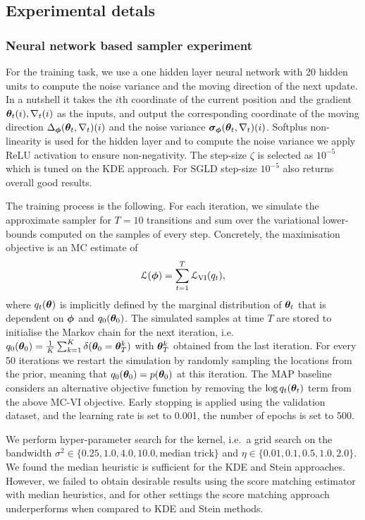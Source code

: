 \subsection{Experimental detals}

\subsubsection{Neural network based sampler experiment}
For the training task, we use a one hidden layer neural network with 20 hidden units to compute the noise variance and the moving direction of the next update. In a nutshell it takes the $i$th coordinate of the current position and the gradient $\bm{\theta}_t(i), \nabla_t(i)$ as the inputs, and output the corresponding coordinate of the moving direction $\Delta_{\bm{\phi}}(\bm{\theta}_t, \nabla_t)(i)$ and the noise variance $\bm{\sigma}_{\bm{\phi}}(\bm{\theta}_t, \nabla_t)(i)$. Softplus non-linearity is used for the hidden layer and to compute the noise variance we apply ReLU activation to ensure non-negativity. The step-size $\zeta$ is selected as $10^{-5}$ which is tuned on the KDE approach. For SGLD step-size $10^{-5}$ also returns overall good results.

The training process is the following. For each iteration, we simulate the approximate sampler for $T=10$ transitions and sum over the variational lower-bounds computed on the samples of every step. Concretely, the maximisation objective is an MC estimate of
$$\mathcal{L}(\bm{\phi}) = \sum_{t=1}^T \mathcal{L}_{\text{VI}}(q_t),$$
where $q_t(\bm{\theta})$ is implicitly defined by the marginal distribution of $\bm{\theta}_t$ that is dependent on $\bm{\phi}$ and $q_0(\bm{\theta}_0)$. 
%
The simulated samples at time $T$ are stored to initialise the Markov chain for the next iteration, i.e. $q_0(\bm{\theta}_0) = \frac{1}{K} \sum_{k=1}^K \delta(\bm{\theta}_0 = \bm{\theta}_T^k)$ with $\bm{\theta}_T^k$ obtained from the last iteration. For every 50 iterations we restart the simulation by randomly sampling the locations from the prior, meaning that $q_0(\bm{\theta}_0) = p(\bm{\theta}_0)$ at this iteration. 
%
The MAP baseline considers an alternative objective function by removing the $\log q_t(\bm{\theta}_t)$ term from the above MC-VI objective.
%
Early stopping is applied using the validation dataset, and the learning rate is set to 0.001, the number of epochs is set to 500.

We perform hyper-parameter search for the kernel, i.e.~a grid search on the bandwidth $\sigma^2 \in \{0.25, 1.0, 4.0, 10.0, \text{median trick} \}$ and $\eta \in \{0.01, 0.1, 0.5, 1.0, 2.0\}$. We found the median heuristic is sufficient for the KDE and Stein approaches. However, we failed to obtain desirable results using the score matching estimator with median heuristics, and for other settings the score matching approach underperforms when compared to KDE and Stein methods.


